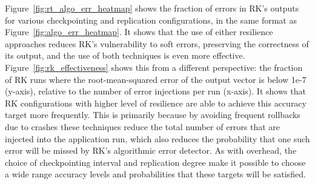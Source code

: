 \documentclass{sig-alternate}
\begin{document}
Figure~\ref{fig:rt_algo_err_heatmap} shows the fraction of errors in RK's outputs for various checkpointing and replication configurations, in the same format as Figure~\ref{fig:algo_err_heatmap}.
It shows that the use of either resilience approaches reduces RK's vulnerability to soft errors, preserving the correctness of its output, and the use of both techniques is even more effective.
Figure~\ref{fig:rk_effectiveness} shows this from a different perspective: the fraction of RK runs where the root-mean-squared error of the output vector is below 1e-7 (y-axis), relative to the number of error injections per run (x-axis).
It shows that RK configurations with higher level of resilience are able to achieve this accuracy target more frequently.
This is primarily because by avoiding frequent rollbacks due to crashes these techniques reduce the total number of errors that are injected into the application run, which also reduces the probability that one such error will be missed by RK's algorithmic error detector.
As with overhead, the choice of checkpointing interval and replication degree make it possible to choose a wide range accuracy levels and probabilities that these targets will be satisfied.
\end{document}

